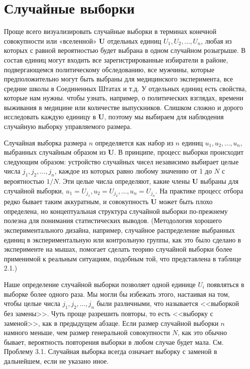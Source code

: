 \section{Случайные выборки}

Проще всего визуализировать случайные выборки в терминах конечной совокупности или «вселенной» $\mathbf{U}$ отдельных единиц $U_1, U_2, \ldots, U_n$, любая из которых с равной вероятностью будет выбрана в одном случайном розыгрыше. В состав единиц могут входить все зарегистрированные избиратели в районе, подвергающемся политическому обследованию, все мужчины, которые предположительно могут быть выбраны для медицинского эксперимента, все средние школы в Соединенных Штатах и т.д. У отдельных единиц есть свойства, которые нам нужны. чтобы узнать, например, о политических взглядах, времени выживания в медицине или количестве выпускников. Слишком сложно и дорого исследовать каждую единицу в $\mathbf{U}$, поэтому мы выбираем для наблюдения случайную выборку управляемого размера. 

Случайная выборка размера $n$ определяется как набор из $n$ единиц $u_1, u_2,\ldots, u_n$, выбранных случайным образом из $\mathbf{U}$. В принципе, процесс выборки происходит следующим образом: устройство случайных чисел независимо выбирает целые числа $j_1 , j_2,\ldots, j_n$, каждое из которых равно любому значению от 1 до $N$ с вероятностью $1 / N$. Эти целые числа определяют, какие члены $\mathbf{U}$ выбраны для случайной выборки, $u_1 = U_{j_1}, u_2 = U_{j_2},\ldots,u_n=U_{j_n}$. На практике процесс отбора редко бывает таким аккуратным, и совокупность $\mathbf{U}$ может быть плохо определена, но концептуальная структура случайной выборки по-прежнему полезна для понимания статистических выводов. (Методология хорошего экспериментального дизайна, например, случайное распределение выбранных единиц в экспериментальную или контрольную группы, как это было сделано в эксперименте на мышах, помогает сделать теорию случайной выборки более применимой к реальным ситуациям, подобным той, что представлена в таблице 2.1.) 

Наше определение случайной выборки позволяет одной единице $U_i$ появляться в выборке более одного раза. Мы могли бы избежать этого, настаивая на том, чтобы целые числа $j_1, j_2,\ldots, j_n$ были различными, что называется <<выборкой без замены>>. Чуть проще разрешить повторы, то есть <<выборку с заменой>>, как в предыдущем абзаце. Если размер случайной выборки $n$ намного меньше, чем размер генеральной совокупности $N$, как это обычно бывает, вероятность повторения выборки в любом случае будет мала. См. Проблему 3.1. Случайная выборка всегда означает выборку с заменой в дальнейшем, если не указано иное. 

